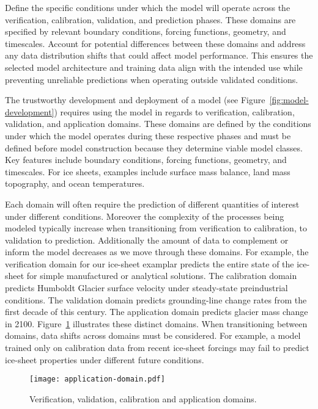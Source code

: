 \begin{essrec}
Define the specific conditions under which the model will operate across the verification, calibration, validation, and prediction phases. These domains are specified by relevant boundary conditions, forcing functions, geometry, and timescales. Account for potential differences between these domains and address any data distribution shifts that could affect model performance. This ensures the selected model architecture and training data align with the intended use while preventing unreliable predictions when operating outside validated conditions.
\end{essrec}

The trustworthy development and deployment of a model (see Figure~\ref{fig:model-development}) requires using the model in regards to verification, calibration, validation, and application domains. These domains are defined by the conditions under which the model operates during these respective phases and must be defined before model construction because they determine viable model classes. Key features include boundary conditions, forcing functions, geometry, and timescales. For ice sheets, examples include surface mass balance, land mass topography, and ocean temperatures.

Each domain will often require the prediction of different quantities of interest under different conditions. Moreover the complexity of the processes being modeled typically increase when transitioning from verification to calibration, to validation to prediction. Additionally the amount of data to complement or inform the model decreases as we move through these domains. For example, the verification domain for our ice-sheet examplar predicts the entire state of the ice-sheet for simple manufactured or analytical solutions. The calibration domain predicts Humboldt Glacier surface velocity under steady-state preindustrial conditions. The validation domain predicts grounding-line change rates from the first decade of this century. The application domain predicts glacier mass change in 2100. Figure~\ref{fig:computational-domains} illustrates these distinct domains. When transitioning between domains, data shifts across domains must be considered. For example, a model trained only on calibration data from recent ice-sheet forcings may fail to predict ice-sheet properties under different future conditions.

\begin{figure}[htb]
    \centering
    \texttt{[image: application-domain.pdf]}
    \caption{Verification, validation, calibration and application domains.}
    \label{fig:computational-domains}
\end{figure}


